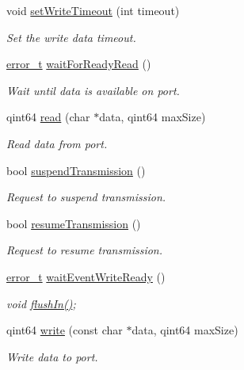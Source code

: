 \begin{DoxyCompactItemize}
void \hyperlink{classmdt_serial_port_a036f49d743838013c9a8cbf6a1dd40d1}{set\-Write\-Timeout} (int timeout)
\begin{DoxyCompactList}\small\item\em Set the write data timeout. \end{DoxyCompactList}\item 
\hyperlink{classmdt_abstract_port_ad4121bb930c95887e77f8bafa065a85e}{error\-\_\-t} \hyperlink{classmdt_serial_port_ad150a45c68d98a501bea2f102aeadb50}{wait\-For\-Ready\-Read} ()
\begin{DoxyCompactList}\small\item\em Wait until data is available on port. \end{DoxyCompactList}\item 
qint64 \hyperlink{classmdt_serial_port_a12274d7956b2af961ccdd36cfc2052cc}{read} (char $\ast$data, qint64 max\-Size)
\begin{DoxyCompactList}\small\item\em Read data from port. \end{DoxyCompactList}\item 
bool \hyperlink{classmdt_serial_port_a9412faf413eca5ee3516139fdfaaf2fe}{suspend\-Transmission} ()
\begin{DoxyCompactList}\small\item\em Request to suspend transmission. \end{DoxyCompactList}\item 
bool \hyperlink{classmdt_serial_port_a02fd5ee74a7f52c3bce0545ec8a659bf}{resume\-Transmission} ()
\begin{DoxyCompactList}\small\item\em Request to resume transmission. \end{DoxyCompactList}\item 
\hyperlink{classmdt_abstract_port_ad4121bb930c95887e77f8bafa065a85e}{error\-\_\-t} \hyperlink{classmdt_serial_port_a988825b3ff2ef93a1b43e2df316055bd}{wait\-Event\-Write\-Ready} ()
\begin{DoxyCompactList}\small\item\em void \hyperlink{classmdt_abstract_port_a32329b4188db796401e4f454755acb44}{flush\-In()}; \end{DoxyCompactList}\item 
qint64 \hyperlink{classmdt_serial_port_a282f99035c032fbb6fa86ccd10deb597}{write} (const char $\ast$data, qint64 max\-Size)
\begin{DoxyCompactList}\small\item\em Write data to port. \end{DoxyCompactList}\item 

\end{DoxyCompactItemize}

